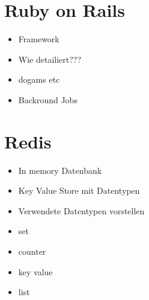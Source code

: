 \section{Ruby on Rails}
\begin{itemize}
	\item Framework
	\item Wie detailiert???
	\item dogams etc
	\item Backround Jobs
\end{itemize}

\section{Redis}
\begin{itemize}
	\item In memory Datenbank
	\item Key Value Store mit Datentypen
	\item Verwendete Datentypen vorstellen
	\item set
	\item counter
	\item key value
	\item list
\end{itemize}


